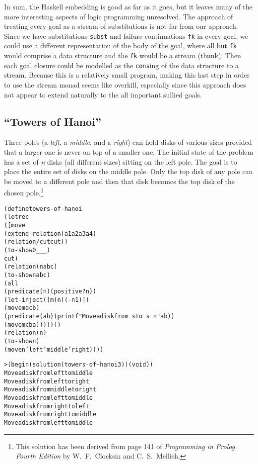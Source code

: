 In sum, the Haskell embedding is good as far as it goes, but it
leaves many of the more interesting aspects of logic programming
unresolved.  The approach of treating every goal as a stream
of substitutions is not far from our approach.  Since we have
substitutions \texttt{subst} and failure continuations \texttt{fk}
in every goal, we could use a different representation of the
body of the goal, where all but \texttt{fk} would comprise
a data structure and the \texttt{fk} would be a stream (thunk).
Then each goal closure could be modelled as the \texttt{cons}ing
of the data structure to a stream.  Because this is a relatively
small program, making this last step in order to use the stream
monad seems like overkill, especially since this approach does not
appear to extend naturally to the all important sullied goals.

\subsection{``Towers of Hanoi''}

Three poles (a \emph{left}, a \emph{middle}, and a \emph{right}) can hold
disks of various sizes provided that a larger one is never on top of a
smaller one.  The initial state of the problem has a set of \emph{n}
disks (all different sizes) sitting on the left pole.  The goal is to
place the entire set of disks on the middle pole.  Only the top disk
of any pole can be moved to a different pole and then that disk
becomes the top disk of the chosen pole.\footnote{This solution has been derived from
page 141 of \emph{Programming in Prolog Fourth Edition} by
W.\ F.\ Clocksin and C.\ S.\ Mellish.}
\begin{alltt}
(define towers-of-hanoi
  (letrec
      ([move
         (extend-relation (a1 a2 a3 a4)
           (relation/cut cut ()
             (to-show 0 _ _ _)
             cut)
           (relation (n a b c)
             (to-show n a b c)
             (all
               (predicate (n) (positive? n))
               (let-inject ([m (n) (- n 1)])
                 (move m a c b)
                 (predicate (a b) (printf "Move a disk from ~s to ~s~n" a b))
                 (move m c b a)))))])
    (relation (n)
      (to-show n)
      (move n 'left 'middle 'right))))
\end{alltt}

\begin{alltt}
> (begin (solution (towers-of-hanoi 3)) (void))
Move a disk from left to middle
Move a disk from left to right
Move a disk from middle to right
Move a disk from left to middle
Move a disk from right to left
Move a disk from right to middle
Move a disk from left to middle
\end{alltt}

